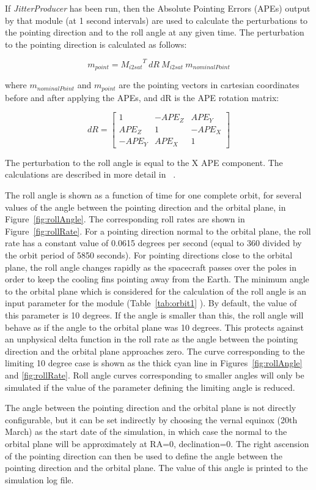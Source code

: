 \documentclass[11pt]{article}      %
\begin{document}
If {\it JitterProducer} has been run, then the Absolute Pointing Errors (APEs) output by that module (at 1 second intervals) are used to calculate the perturbations to the pointing direction and to the roll angle at any given time. The perturbation to the pointing direction is calculated as follows:

\[m_{point} = {M_{i2sat}}^T\ dR\ M_{i2sat}\ m_{nominalPoint}\]

where $m_{nominalPoint}$ and $m_{point}$ are the pointing vectors in cartesian coordinates before and after applying the APEs, and dR is the APE rotation matrix:

\[
dR = \begin{bmatrix} 
1 & -APE_Z & APE_Y \\ 
APE_Z & 1 & -APE_X \\ 
-APE_Y & APE_X & 1  
\end{bmatrix}
\]

The perturbation to the roll angle is equal to the X APE component. The calculations are described in more detail in ~\cite{rollAngleAlgo}.

The roll angle is shown as a function of time for one complete orbit, for several values of the angle between the pointing direction and the orbital plane, in Figure~\ref{fig:rollAngle}. The corresponding roll rates are shown in Figure~\ref{fig:rollRate}. For a pointing direction normal to the orbital plane, the roll rate has a constant value of 0.0615 degrees per second (equal to 360 divided by the orbit period of 5850 seconds). For pointing directions close to the orbital plane, the roll angle changes rapidly as the spacecraft passes over the poles in order to keep the cooling fins pointing away from the Earth. The minimum angle to the orbital plane which is considered for the calculation of the roll angle is an input parameter for the module (Table~\ref{tab:orbit1} ). By default, the value of this parameter is 10 degrees. If the angle is smaller than this, the roll angle will behave as if the angle to the orbital plane was 10 degrees. This protects against an unphysical delta function in the roll rate as the angle between the pointing direction and the orbital plane approaches zero. The curve corresponding to the limiting 10 degree case is shown as the thick cyan line in Figures~\ref{fig:rollAngle} and \ref{fig:rollRate}. Roll angle curves corresponding to smaller angles will only be simulated if the value of the parameter defining the limiting angle is reduced.

The angle between the pointing direction and the orbital plane is not directly configurable, but it can be set indirectly by choosing the vernal equinox (20th March) as the start date of the simulation, in which case the normal to the orbital plane will be approximately at RA=0, declination=0. The right ascension of the pointing direction can then be used to define the angle between the pointing direction and the orbital plane. The value of this angle is printed to the simulation log file.
\end{document}
